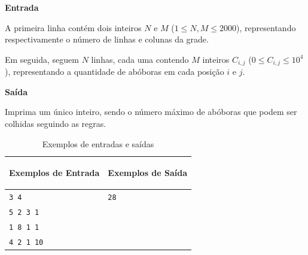 \vspace{0.3cm}
\textbf{Entrada}

A primeira linha contém dois inteiros $N$ e $M$ ($1 \leq N, M \leq 2000$), representando respectivamente o número de linhas e colunas da grade.

Em seguida, seguem $N$ linhas, cada uma contendo $M$ inteiros $C_{i,j}$ ($0 \leq C_{i,j} \leq 10^4$), representando a quantidade de abóboras em cada posição $i$ e $j$.

\vspace{0.3cm}
\textbf{Saída}

Imprima um único inteiro, sendo o número máximo de abóboras que podem ser colhidas seguindo as regras.

\begin{table}[ht]
    \centering
    \begin{tabular}{|p{7cm}|p{7cm}|}
        \hline
        \begin{center}
            \vspace{-0.3cm}
            \textbf{Exemplos de Entrada}
            \vspace{-0.3cm}
        \end{center} 
         &  
        \begin{center}
            \vspace{-0.3cm}
            \textbf{Exemplos de Saída}
            \vspace{-0.3cm}
        \end{center} \\ \hline
         \texttt{3 4} & \texttt{28} \\
         \texttt{5 2 3 1} & \texttt{} \\
         \texttt{1 8 1 1} & \texttt{} \\
         \texttt{4 2 1 10} & \texttt{} \\
         \hline
    \end{tabular}
    
    \caption{Exemplos de entradas e saídas}
    \label{tab:inputA1}
    
\end{table}

\vspace{0.3cm}

\newpage

\begin{center}
\noindent

\end{center}